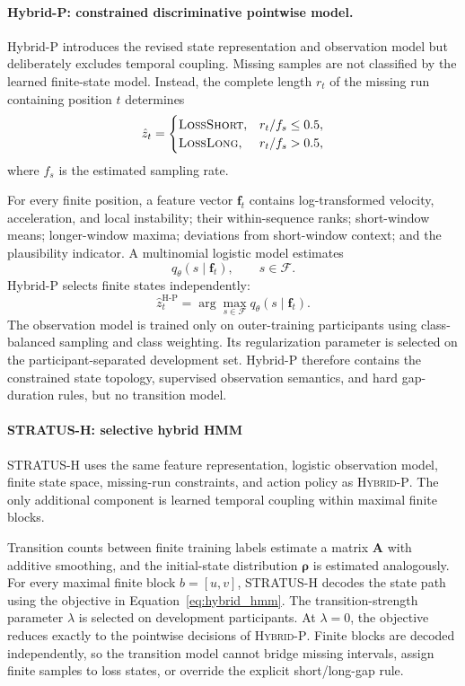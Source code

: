 \documentclass[sigconf,review]{acmart}
\newcommand{\methodHP}{\textsc{Hybrid-P}\xspace}
\newcommand{\methodH}{\textsc{STRATUS-H}\xspace}
\begin{document}
\paragraph{Hybrid-P: constrained discriminative pointwise model.}
Hybrid-P introduces the revised state representation and observation
model but deliberately excludes temporal coupling. Missing samples are
not classified by the learned finite-state model. Instead, the complete
length $r_t$ of the missing run containing position $t$ determines
\[
\hat{z}_t
=
\begin{cases}
\textsc{LossShort},
& r_t / f_s \leq 0.5,\\
\textsc{LossLong},
& r_t / f_s > 0.5,
\end{cases}
\]
where $f_s$ is the estimated sampling rate.

For every finite position, a feature vector $\mathbf{f}_t$ contains
log-transformed velocity, acceleration, and local instability; their
within-sequence ranks; short-window means; longer-window maxima;
deviations from short-window context; and the plausibility indicator.
A multinomial logistic model estimates
\[
q_{\theta}(s\mid\mathbf{f}_t),
\qquad s\in\mathcal{F}.
\]
Hybrid-P selects finite states independently:
\[
\hat{z}_t^{\mathrm{H\text{-}P}}
=
\arg\max_{s\in\mathcal{F}}
q_{\theta}(s\mid\mathbf{f}_t).
\]
The observation model is trained only on outer-training participants
using class-balanced sampling and class weighting. Its regularization
parameter is selected on the participant-separated development set.
Hybrid-P therefore contains the constrained state topology, supervised
observation semantics, and hard gap-duration rules, but no transition
model.

\paragraph{STRATUS-H: selective hybrid HMM}
\methodH uses the same feature representation, logistic observation
model, finite state space, missing-run constraints, and action policy as
\methodHP. The only additional component is learned temporal coupling
within maximal finite blocks.

Transition counts between finite training labels estimate a matrix
\(\mathbf{A}\) with additive smoothing, and the initial-state distribution
\(\boldsymbol{\rho}\) is estimated analogously. For every maximal finite
block \(b=[u,v]\), \methodH decodes the state path using the objective in
Equation~\eqref{eq:hybrid_hmm}.
The transition-strength parameter $\lambda$ is selected on development
participants. At $\lambda=0$, the objective reduces exactly to the
pointwise decisions of \methodHP. Finite blocks are decoded independently,
so the transition model cannot bridge missing intervals, assign finite
samples to loss states, or override the explicit short/long-gap rule.
\end{document}
